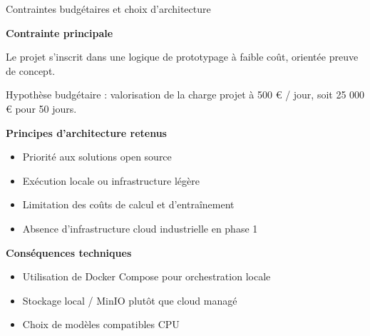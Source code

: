 \begin{frame}{Contraintes budgétaires et choix d’architecture}
	\small
	
	\textbf{Contrainte principale}
	
	Le projet s’inscrit dans une logique de prototypage à faible coût, orientée preuve de concept.
	
	Hypothèse budgétaire : valorisation de la charge projet à 500 € / jour, soit 25 000 € pour 50 jours.
	
	\vspace{0.2cm}
	
	\begin{minipage}[t]{0.48\textwidth}
		\textbf{Principes d’architecture retenus}
		\begin{itemize}
			\item Priorité aux solutions open source
			\item Exécution locale ou infrastructure légère
			\item Limitation des coûts de calcul et d’entraînement
			\item Absence d’infrastructure cloud industrielle en phase 1
		\end{itemize}
	\end{minipage}
	\hfill
	\begin{minipage}[t]{0.48\textwidth}
		\textbf{Conséquences techniques}
		\begin{itemize}
			\item Utilisation de Docker Compose pour orchestration locale
			\item Stockage local / MinIO plutôt que cloud managé
			\item Choix de modèles compatibles CPU
		\end{itemize}
	\end{minipage}
	
%	
%	
%	
%	
	

\end{frame}
